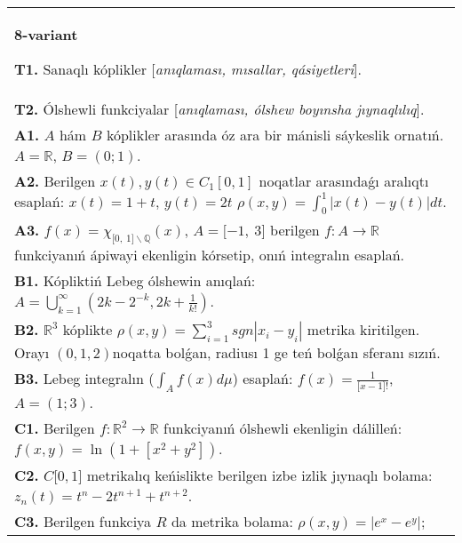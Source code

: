 \documentclass{article}
\begin{document}
\begin{tabular}{m{17cm}}
\textbf{8-variant}
\newline

\textbf{T1.} Sanaqlı kóplikler [\textit{anıqlaması, mısallar, qásiyetleri}]. \\
\textbf{T2.} Ólshewli funkciyalar [\textit{anıqlaması, ólshew boyınsha jıynaqlılıq}]. \\
\textbf{A1.} \(A\) hám \(B\) kóplikler arasında óz ara bir mánisli sáykeslik ornatıń. \(A\mathbb{= R}\), \(B = (0;1)\). \\
\textbf{A2.} Berilgen \(x(t),y(t)\in C_1[0,1]\) noqatlar arasındaǵı aralıqtı esaplań: \(x(t) = 1 + t\), \(y(t) = 2t\) \(\rho(x,y) = \int_{0}^{1}{\left| x(t) - y(t) \right|dt}\). \\
\textbf{A3.} \(f(x) = \chi_{\lbrack 0,\ 1\rbrack\backslash\mathbb{Q}}(x)\), \(A = \lbrack - 1,\ 3\rbrack\) berilgen \(f:A\rightarrow\mathbb{R}\) funkciyanıń ápiwayi ekenligin kórsetip, onıń integralın esaplań. \\
\textbf{B1.} Kópliktiń Lebeg ólshewin anıqlań: \(A = \bigcup_{k = 1}^{\infty}\left( 2k - 2^{- k},2k + \frac{1}{k!} \right)\). \\
\textbf{B2.} \(\mathbb{R}^{3}\) kóplikte \(\rho(x,y) = \sum_{i = 1}^{3}{sgn\left| x_{i} - y_{i} \right|}\) metrika kiritilgen. Orayı \((0,1,2)\)noqatta bolǵan, radiusı 1 ge teń bolǵan sferanı sızıń. \\
\textbf{B3.} Lebeg integralın (\(\int_{A}^{}{f(x)d\mu}\)) esaplań: \(f(x) = \frac{1}{\lbrack x - 1\rbrack!}\), \(A = (1;3)\). \\
\textbf{C1.} Berilgen \(f:\mathbb{R}^{2}\mathbb{\rightarrow R}\) funkciyanıń ólshewli ekenligin dálilleń: \(f(x,y) = \ln\left( 1 + \left\lbrack x^{2} + y^{2} \right\rbrack \right)\). \\
\textbf{C2.} \(C\lbrack 0,1\rbrack\) metrikalıq keńislikte berilgen izbe izlik jıynaqlı bolama: \(z_{n}(t) = t^{n} - 2t^{n + 1} + t^{n + 2}\). \\
\textbf{C3.} Berilgen funkciya \(R\) da metrika bolama: \(\rho(x,y) = \left| e^{x} - e^{y} \right|\); \\

\end{tabular}
\vspace{1cm}
\end{document}
